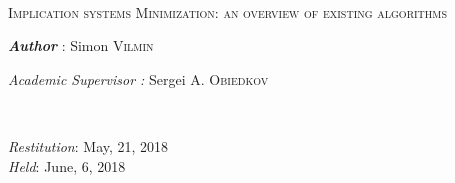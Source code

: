 \begin{titlepage}
\begin{center}
        
        \TLine \\
        \vspace{1.2em}
        \textsc{\LARGE{Implication systems Minimization: an overview of existing algorithms}}
        \TLine \\
        
        \vspace{5mm}
        \noindent
        
        
        \begin{minipage}{0.4\textwidth}
            \begin{flushleft}
                \hspace{-20mm}
                \vspace{10mm}
                \textit{\textbf{Author}} : Simon \textsc{Vilmin}\\  
                
                \vspace{4mm}
                
                \hspace{-20mm}
                \emph{Academic Supervisor :} Sergei A. \textsc{Obiedkov} \\
                \vspace{1.2em}
                \hspace{-20mm}
                    
            \end{flushleft}
        \end{minipage}
        ~
        \begin{minipage}{0.4\textwidth}
            \begin{flushright}
                \vspace{19mm}
                \emph{Restitution}: May, 21, 2018 \\
                \emph{Held}: June, 6, 2018 \\
                \vspace{1.2em}
            \end{flushright}
        \end{minipage}
        

\end{center}
\end{titlepage}
